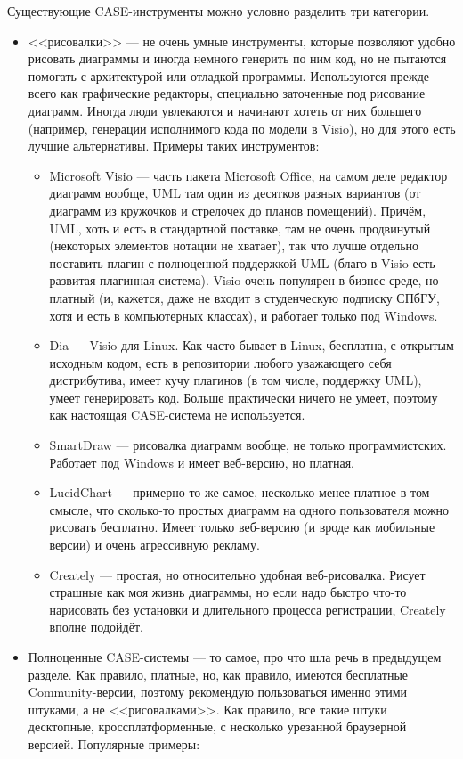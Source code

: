\documentclass{../../text-style}
\begin{document}
Существующие CASE-инструменты можно условно разделить три категории.

\begin{itemize}
    \item <<рисовалки>> --- не очень умные инструменты, которые позволяют удобно рисовать диаграммы и иногда немного генерить по ним код, но не пытаются помогать с архитектурой или отладкой программы. Используются прежде всего как графические редакторы, специально заточенные под рисование диаграмм. Иногда люди увлекаются и начинают хотеть от них большего (например, генерации исполнимого кода по модели в Visio), но для этого есть лучшие альтернативы. Примеры таких инструментов:
    \begin{itemize}
        \item Microsoft Visio --- часть пакета Microsoft Office, на самом деле редактор диаграмм вообще, UML там один из десятков разных вариантов (от диаграмм из кружочков и стрелочек до планов помещений). Причём, UML, хоть и есть в стандартной поставке, там не очень продвинутый (некоторых элементов нотации не хватает), так что лучше отдельно поставить плагин с полноценной поддержкой UML (благо в Visio есть развитая плагинная система). Visio очень популярен в бизнес-среде, но платный (и, кажется, даже не входит в студенческую подписку СПбГУ, хотя и есть в компьютерных классах), и работает только под Windows.
        \item Dia --- Visio для Linux. Как часто бывает в Linux, бесплатна, с открытым исходным кодом, есть в репозитории любого уважающего себя дистрибутива, имеет кучу плагинов (в том числе, поддержку UML), умеет генерировать код. Больше практически ничего не умеет, поэтому как настоящая CASE-система не используется.
        \item SmartDraw --- рисовалка диаграмм вообще, не только программистских. Работает под Windows и имеет веб-версию, но платная.
        \item LucidChart --- примерно то же самое, несколько менее платное в том смысле, что сколько-то простых диаграмм на одного пользователя можно рисовать бесплатно. Имеет только веб-версию (и вроде как мобильные версии) и очень агрессивную рекламу.
        \item Creately --- простая, но относительно удобная веб-рисовалка. Рисует страшные как моя жизнь диаграммы, но если надо быстро что-то нарисовать без установки и длительного процесса регистрации, Creately вполне подойдёт.
    \end{itemize}
    \item Полноценные CASE-системы --- то самое, про что шла речь в предыдущем разделе. Как правило, платные, но, как правило, имеются бесплатные Community-версии, поэтому рекомендую пользоваться именно этими штуками, а не <<рисовалками>>. Как правило, все такие штуки десктопные, кроссплатформенные, с несколько урезанной браузерной версией. Популярные примеры:

\end{itemize}
\end{document}
